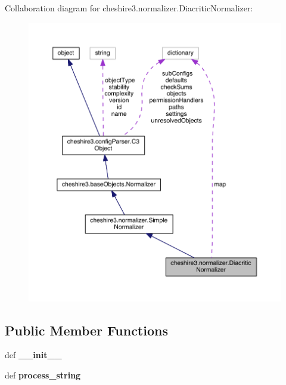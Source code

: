 Collaboration diagram for cheshire3.\-normalizer.\-Diacritic\-Normalizer\-:
\nopagebreak
\begin{figure}[H]
\begin{center}
\leavevmode
\includegraphics[width=350pt]{classcheshire3_1_1normalizer_1_1_diacritic_normalizer__coll__graph}
\end{center}
\end{figure}
\subsection*{Public Member Functions}
\begin{DoxyCompactItemize}
\item 
\hypertarget{classcheshire3_1_1normalizer_1_1_diacritic_normalizer_af85db6507b1711c3250cde979a6e531b}{def {\bfseries \-\_\-\-\_\-init\-\_\-\-\_\-}}\label{classcheshire3_1_1normalizer_1_1_diacritic_normalizer_af85db6507b1711c3250cde979a6e531b}

\item 
\hypertarget{classcheshire3_1_1normalizer_1_1_diacritic_normalizer_a7f445ac0779ad5fdfc08cf08f429f31d}{def {\bfseries process\-\_\-string}}\label{classcheshire3_1_1normalizer_1_1_diacritic_normalizer_a7f445ac0779ad5fdfc08cf08f429f31d}

\end{DoxyCompactItemize}
